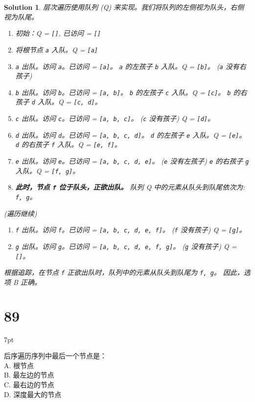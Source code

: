 \documentclass[UTF8]{report}
\newtheorem{solution}{Solution}
\theoremstyle{MyLineTheoremStyle} %
\theoremstyle{MyBlockTheoremStyle} %
\theoremstyle{MySubsubsectionStyle} %
\newenvironment{graybox}{%
        \def\FrameCommand{%
        \hspace{1pt}%
        {\color{gray}\small \vrule width 2pt}%
        {\color{graybox_color}\vrule width 4pt}%
        \colorbox{graybox_color}%
        }%
        \MakeFramed{\advance\hsize-\width\FrameRestore}%
        \noindent\hspace{-4.55pt}%
        \begin{adjustwidth}{}{7pt}%
        \vspace{2pt}\vspace{2pt}%
        }
        {%
        \vspace{2pt}\end{adjustwidth}\endMakeFramed%
        }
\begin{document}
\begin{solution}
层次遍历使用队列 (Q) 来实现。我们将队列的左侧视为队头，右侧视为队尾。
\begin{enumerate}
    \item 初始：Q = \texttt{[]}, 已访问 = \texttt{[]}
    \item 将根节点 \texttt{a} 入队。Q = \texttt{[a]}
    \item \texttt{a} 出队。访问 \texttt{a}。已访问 = \texttt{[a]}。
          \texttt{a} 的左孩子 \texttt{b} 入队。Q = \texttt{[b]}。
          (\texttt{a} 没有右孩子)
    \item \texttt{b} 出队。访问 \texttt{b}。已访问 = \texttt{[a, b]}。
          \texttt{b} 的左孩子 \texttt{c} 入队。Q = \texttt{[c]}。
          \texttt{b} 的右孩子 \texttt{d} 入队。Q = \texttt{[c, d]}。
    \item \texttt{c} 出队。访问 \texttt{c}。已访问 = \texttt{[a, b, c]}。
          (\texttt{c} 没有孩子)
          Q = \texttt{[d]}。
    \item \texttt{d} 出队。访问 \texttt{d}。已访问 = \texttt{[a, b, c, d]}。
          \texttt{d} 的左孩子 \texttt{e} 入队。Q = \texttt{[e]}。
          \texttt{d} 的右孩子 \texttt{f} 入队。Q = \texttt{[e, f]}。
    \item \texttt{e} 出队。访问 \texttt{e}。已访问 = \texttt{[a, b, c, d, e]}。
          (\texttt{e} 没有左孩子)
          \texttt{e} 的右孩子 \texttt{g} 入队。Q = \texttt{[f, g]}。
    \item \textbf{此时，节点 \texttt{f} 位于队头，正欲出队。}
          队列 Q 中的元素从队头到队尾依次为: \texttt{f, g}。
\end{enumerate}
(遍历继续)
\begin{enumerate}
    \item[8.] \texttt{f} 出队。访问 \texttt{f}。已访问 = \texttt{[a, b, c, d, e, f]}。
          (\texttt{f} 没有孩子)
          Q = \texttt{[g]}。
    \item[9.] \texttt{g} 出队。访问 \texttt{g}。已访问 = \texttt{[a, b, c, d, e, f, g]}。
          (\texttt{g} 没有孩子)
          Q = \texttt{[]}。
\end{enumerate}
根据追踪，在节点 \texttt{f} 正欲出队时，队列中的元素从队头到队尾为 \texttt{f, g}。
因此，选项 B 正确。
\end{solution}


\section*{89}
\begin{graybox}
后序遍历序列中最后一个节点是： \\
A. 根节点 \\
B. 最左边的节点 \\
C. 最右边的节点 \\
D. 深度最大的节点
\end{graybox}
\end{document}
